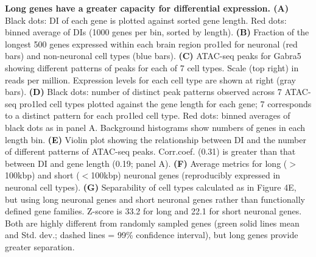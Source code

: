 \textbf{Long genes have a greater capacity for differential expression. (A)} Black dots: DI of each gene is plotted against sorted gene length. Red dots: binned average of DIs (1000 genes per bin, sorted by length). \textbf{(B)} Fraction of the longest 500 genes expressed within each brain region pro1led for neuronal (red bars) and non-neuronal cell types (blue bars). \textbf{(C)} ATAC-seq peaks for Gabra5 showing different patterns of peaks for each of 7 cell types. Scale (top right) in reads per million. Expression levels for each cell type are shown at right (gray bars). \textbf{(D)} Black dots: number of distinct peak patterns observed across 7 ATAC-seq pro1led cell types plotted against the gene length for each gene; 7 corresponds to a distinct pattern for each pro1led cell type. Red dots: binned averages of black dots as in panel A. Background histograms show numbers of genes in each length bin. \textbf{(E)} Violin plot showing the relationship between DI and the number of different patterns of ATAC-seq peaks. Corr.coef. (0.31) is greater than that between DI and gene length (0.19; panel A). \textbf{(F)} Average metrics for long ($\gt$100kbp) and short ($\lt$100kbp) neuronal genes (reproducibly expressed in neuronal cell types). \textbf{(G)} Separability of cell types calculated as in Figure 4E, but using long neuronal genes and short neuronal genes rather than functionally defined gene families. Z-score is 33.2 for long and 22.1 for short neuronal genes. Both are highly different from randomly sampled genes (green solid lines mean and Std. dev.; dashed lines = 99\% confidence interval), but long genes provide greater separation.